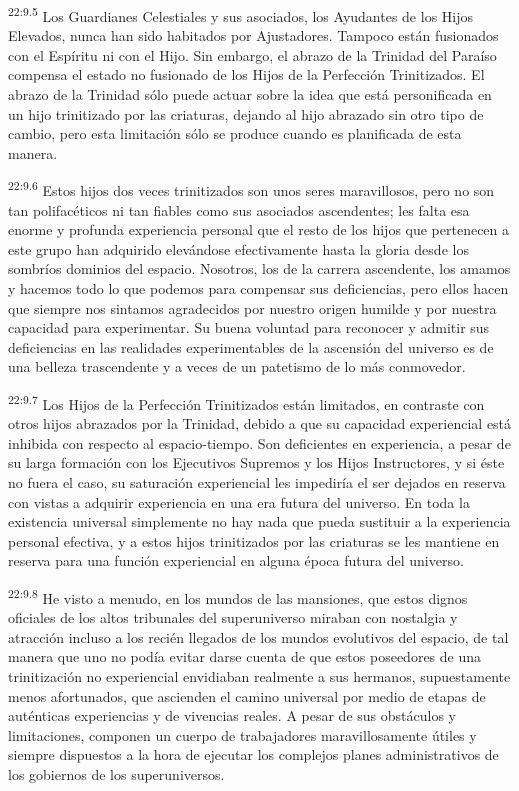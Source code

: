 \par
\textsuperscript{22:9.5} Los Guardianes Celestiales y sus asociados, los Ayudantes de los Hijos Elevados, nunca han sido habitados por Ajustadores. Tampoco están fusionados con el Espíritu ni con el Hijo. Sin embargo, el abrazo de la Trinidad del Paraíso compensa el estado no fusionado de los Hijos de la Perfección Trinitizados. El abrazo de la Trinidad sólo puede actuar sobre la idea que está personificada en un hijo trinitizado por las criaturas, dejando al hijo abrazado sin otro tipo de cambio, pero esta limitación sólo se produce cuando es planificada de esta manera.

\par
\textsuperscript{22:9.6} Estos hijos dos veces trinitizados son unos seres maravillosos, pero no son tan polifacéticos ni tan fiables como sus asociados ascendentes; les falta esa enorme y profunda experiencia personal que el resto de los hijos que pertenecen a este grupo han adquirido elevándose efectivamente hasta la gloria desde los sombríos dominios del espacio. Nosotros, los de la carrera ascendente, los amamos y hacemos todo lo que podemos para compensar sus deficiencias, pero ellos hacen que siempre nos sintamos agradecidos por nuestro origen humilde y por nuestra capacidad para experimentar. Su buena voluntad para reconocer y admitir sus deficiencias en las realidades experimentables de la ascensión del universo es de una belleza trascendente y a veces de un patetismo de lo más conmovedor.

\par
\textsuperscript{22:9.7} Los Hijos de la Perfección Trinitizados están limitados, en contraste con otros hijos abrazados por la Trinidad, debido a que su capacidad experiencial está inhibida con respecto al espacio-tiempo. Son deficientes en experiencia, a pesar de su larga formación con los Ejecutivos Supremos y los Hijos Instructores, y si éste no fuera el caso, su saturación experiencial les impediría el ser dejados en reserva con vistas a adquirir experiencia en una era futura del universo. En toda la existencia universal simplemente no hay nada que pueda sustituir a la experiencia personal efectiva, y a estos hijos trinitizados por las criaturas se les mantiene en reserva para una función experiencial en alguna época futura del universo.

\par
\textsuperscript{22:9.8} He visto a menudo, en los mundos de las mansiones, que estos dignos oficiales de los altos tribunales del superuniverso miraban con nostalgia y atracción incluso a los recién llegados de los mundos evolutivos del espacio, de tal manera que uno no podía evitar darse cuenta de que estos poseedores de una trinitización no experiencial envidiaban realmente a sus hermanos, supuestamente menos afortunados, que ascienden el camino universal por medio de etapas de auténticas experiencias y de vivencias reales. A pesar de sus obstáculos y limitaciones, componen un cuerpo de trabajadores maravillosamente útiles y siempre dispuestos a la hora de ejecutar los complejos planes administrativos de los gobiernos de los superuniversos.

